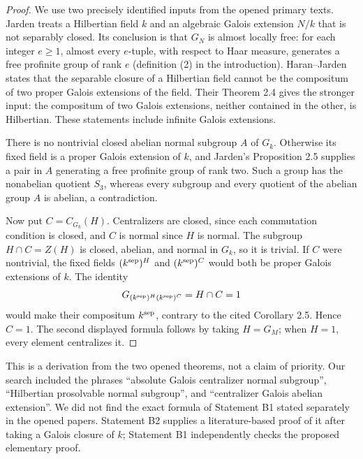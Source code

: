 \begin{proof}
We use two precisely identified inputs from the opened primary texts.
Jarden \cite[Proposition 2.5]{B_Jarden2011} treats a Hilbertian field $k$
and an algebraic Galois extension $N/k$ that is not separably closed. Its
conclusion is that $G_N$ is almost locally free: for each integer $e\ge1$,
almost every $e$-tuple, with respect to Haar measure, generates a free
profinite group of rank $e$ (definition (2) in the introduction).
Haran--Jarden \cite[Corollary 2.5]{B_HaranJarden1991} states that the
separable closure of a Hilbertian field cannot be the compositum of two
proper Galois extensions of the field. Their Theorem 2.4 gives the stronger
input: the compositum of two Galois extensions, neither contained in the
other, is Hilbertian. These statements include infinite Galois extensions.

There is no nontrivial closed abelian normal subgroup $A$ of $G_k$.
Otherwise its fixed field is a proper Galois extension of $k$, and Jarden's
Proposition 2.5 supplies a pair in $A$ generating a free profinite group of
rank two. Such a group has the nonabelian quotient $S_3$, whereas every
subgroup and every quotient of the abelian group $A$ is abelian, a
contradiction.

Now put $C=C_{G_k}(H)$. Centralizers are closed, since each commutation
condition is closed, and $C$ is normal since $H$ is normal. The subgroup
$H\cap C=Z(H)$ is closed, abelian, and normal in $G_k$, so it is trivial.
If $C$ were nontrivial, the fixed fields
$(k^{\rm sep})^H$ and $(k^{\rm sep})^C$ would both be proper Galois
extensions of $k$. The identity
\[
 G_{(k^{\rm sep})^H(k^{\rm sep})^C}=H\cap C=1
\]
would make their compositum $k^{\rm sep}$, contrary to the cited
Corollary 2.5. Hence $C=1$. The second displayed formula follows by taking
$H=G_M$; when $H=1$, every element centralizes it.
\end{proof}

This is a derivation from the two opened theorems, not a claim of priority.
Our search included the phrases ``absolute Galois centralizer normal
subgroup'', ``Hilbertian prosolvable normal subgroup'', and ``centralizer
Galois abelian extension''. We did not find the exact formula of Statement
B1 stated separately in the opened papers. Statement B2 supplies a
literature-based proof of it after taking a Galois closure of $k$; Statement
B1 independently checks the proposed elementary proof.

